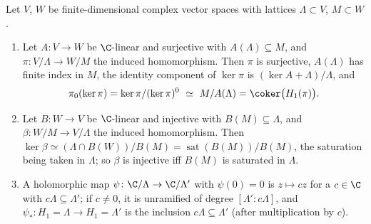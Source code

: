 \begin{lemma}\label{lem:curves:tori}
Let $V$, $W$ be finite-dimensional complex vector spaces with lattices $\Lambda\subset V$, $M\subset W$.
\begin{enumerate}[label=(\alph*)]
\item Let $A\colon V\to W$ be $\C$-linear and surjective with $A(\Lambda)\subseteq M$, and $\pi\colon V/\Lambda\to W/M$ the induced homomorphism. Then $\pi$ is surjective, $A(\Lambda)$ has finite
index in $M$, the identity component of $\ker\pi$ is $(\ker A+\Lambda)/\Lambda$, and
\[
\pi_0(\ker\pi)=\ker\pi/(\ker\pi)^0\ \simeq\ M/A(\Lambda)=\coker\bigl(H_1(\pi)\bigr).
\]
\item Let $B\colon W\to V$ be $\C$-linear and injective with $B(M)\subseteq\Lambda$, and $\beta\colon W/M\to V/\Lambda$ the induced homomorphism. Then
$\ker\beta\simeq(\Lambda\cap B(W))/B(M)=\operatorname{sat}(B(M))/B(M)$, the saturation being taken in $\Lambda$; so $\beta$ is injective iff $B(M)$ is saturated in $\Lambda$.
\item A holomorphic map $\psi\colon\C/\Lambda\to\C/\Lambda'$ with $\psi(0)=0$ is $z\mapsto cz$ for a $c\in\C$ with $c\Lambda\subseteq\Lambda'$; if $c\ne0$, it is unramified of degree
$[\Lambda':c\Lambda]$, and $\psi_*\colon H_1=\Lambda\to H_1=\Lambda'$ is the inclusion $c\Lambda\subseteq\Lambda'$ (after multiplication by $c$).
\end{enumerate}
\end{lemma}

